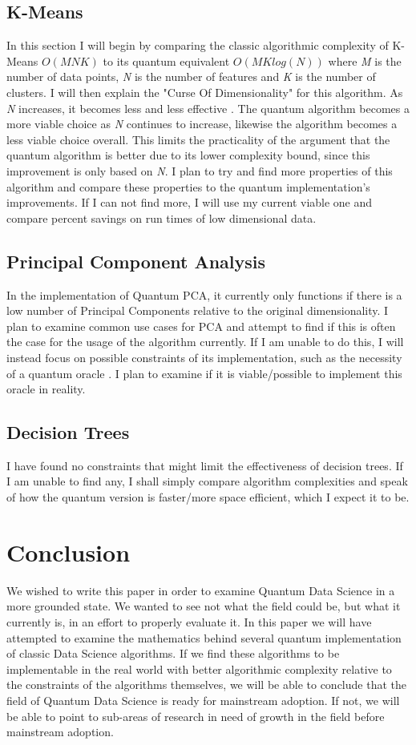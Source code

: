 \documentclass[conference]{IEEEtran}
\begin{document}
\subsection{K-Means}
In this section I will begin by comparing the classic algorithmic complexity of K-Means $O(MNK)$ to its quantum equivalent $O(MKlog(N))$ where \emph{M} is the number of data points, \emph{N} is the number of features and \emph{K} is the number of clusters. I will then explain the "Curse Of Dimensionality" for this algorithm. As \emph{N} increases, it becomes less and less effective \cite{b15}. The quantum algorithm becomes a more viable choice as \emph{N} continues to increase, likewise the algorithm becomes a less viable choice overall. This limits the practicality of the argument that the quantum algorithm is better due to its lower complexity bound, since this improvement is only based on \emph{N}. I plan to try and find more properties of this algorithm and compare these properties to the quantum implementation's improvements. If I can not find more, I will use my current viable one and compare percent savings on run times of low dimensional data. 

\subsection{Principal Component Analysis}
In the implementation of Quantum PCA, it currently only functions if there is a low number of Principal Components relative to the original dimensionality. I plan to examine common use cases for PCA and attempt to find if this is often the case for the usage of the algorithm currently. If I am unable to do this, I will instead focus on possible constraints of its implementation, such as the necessity of a quantum oracle \cite{b7}. I plan to examine if it is viable/possible to implement this oracle in reality.  
\subsection{Decision Trees}
I have found no constraints that might limit the effectiveness of decision trees. If I am unable to find any, I shall simply compare algorithm complexities and speak of how the quantum version is faster/more space efficient, which I expect it to be. 

\section{Conclusion}
We wished to write this paper in order to examine Quantum Data Science in a more grounded state. We wanted to see not what the field could be, but what it currently is, in an effort to properly evaluate it. In this paper we will have attempted to examine the mathematics behind several quantum implementation of classic Data Science algorithms. If we find these algorithms to be implementable in the real world with better algorithmic complexity relative to the constraints of the algorithms themselves, we will be able to conclude that the field of Quantum Data Science is ready for mainstream adoption. If not, we will be able to point to sub-areas of research in need of growth in the field before mainstream adoption.  
\end{document}

